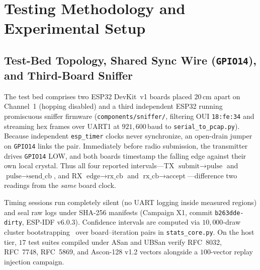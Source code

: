 \documentclass[conference]{IEEEtran}
\begin{document}
\section{Testing Methodology and Experimental Setup}

\subsection{Test-Bed Topology, Shared Sync Wire (\texttt{GPIO14}), and Third-Board Sniffer}\label{sec:hop-disabled}\label{sec:sniffer}\label{sec:capture}
The test bed comprises two ESP32 DevKit~v1 boards placed $20$\,cm apart on Channel~1 (hopping disabled) and a third independent ESP32 running promiscuous sniffer firmware (\texttt{components/sniffer/}, filtering OUI \texttt{18:fe:34} and streaming hex frames over UART1 at $921{,}600$\,baud to \texttt{serial\_to\_pcap.py}). Because independent \texttt{esp\_timer} clocks never synchronize, an open-drain jumper on \texttt{GPIO14} links the pair. Immediately before radio submission, the transmitter drives \texttt{GPIO14} LOW, and both boards timestamp the falling edge against their own local crystal. Thus all four reported intervals---TX $\text{submit}\rightarrow\text{pulse}$ and $\text{pulse}\rightarrow\text{send\_cb}$, and RX $\text{edge}\rightarrow\text{rx\_cb}$ and $\text{rx\_cb}\rightarrow\text{accept}$---difference two readings from the \emph{same} board clock.

Timing sessions run completely silent (no UART logging inside measured regions) and seal raw logs under SHA-256 manifests (Campaign X1, commit \texttt{b263dde-dirty}, ESP-IDF v6.0.3). Confidence intervals are computed via $10{,}000$-draw cluster bootstrapping~\cite{efron1979bootstrap} over board--iteration pairs in \texttt{stats\_core.py}. On the host tier, $17$ test suites compiled under ASan and UBSan verify RFC~8032, RFC~7748, RFC~5869, and Ascon-128 v1.2 vectors alongside a $100$-vector replay injection campaign.
\end{document}
